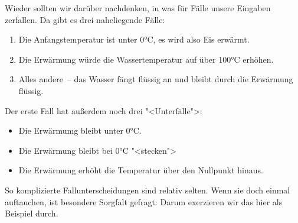 %
Wieder sollten wir darüber nachdenken, in was für Fälle unsere
Eingaben zerfallen.  Da gibt es drei naheliegende Fälle:
%
\begin{enumerate}
\item Die Anfangstemperatur ist unter 0°C, es wird also Eis erwärmt.
\item Die Erwärmung würde die Wassertemperatur auf über 100°C erhöhen.
\item Alles andere~-- das Wasser fängt flüssig an und bleibt durch die
  Erwärmung flüssig.
\end{enumerate}
%
Der erste Fall hat außerdem noch drei "<Unterfälle">:
%
\begin{itemize}
\item Die Erwärmumg bleibt unter 0°C.
\item Die Erwärmung bleibt bei  0°C "<stecken">
\item Die Erwärmung erhöht die Temperatur über den Nullpunkt hinaus.
\end{itemize}
%
So komplizierte Fallunterscheidungen sind relativ selten. Wenn sie
doch einmal auftauchen, ist besondere Sorgfalt gefragt: Darum
exerzieren wir das hier als Beispiel durch.

